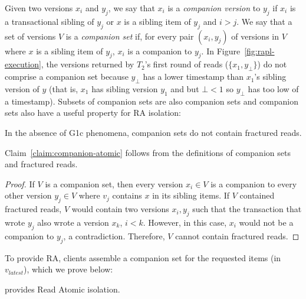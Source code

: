 Given two versions $x_i$ and $y_j$, we say that $x_i$ is a
\textit{companion version} to $y_j$ if $x_i$ is a transactional
sibling of $y_j$ or $x$ is a sibling item of $y_j$ and $i > j$. We say
that a set of versions $V$ is a \textit{companion set} if, for every
pair $(x_i, y_j)$ of versions in $V$ where $x$ is a sibling item of
$y_j$, $x_i$ is a companion to $y_j$. In
Figure~\ref{fig:rapl-execution}, the versions returned by $T_2$'s
first round of reads ($\{x_1, y_\bot\}$) do not comprise a companion
set because $y_\bot$ has a lower timestamp than $x_1$'s sibling
version of $y$ (that is, $x_1$ has sibling version $y_1$ and but $\bot
< 1$ so $y_\bot$ has too low of a timestamp). Subsets of companion
sets are also companion sets and companion sets also have a useful
property for RA isolation:
\begin{claim}
\label{claim:companion-atomic}
In the absence of G1c phenomena, companion sets do not contain fractured reads.
\end{claim}

Claim~\ref{claim:companion-atomic} follows from the definitions of
companion sets and fractured reads.

\begin{proof}
If $V$ is a companion set, then
every version $x_i \in V$ is a companion to every other version
$y_j \in V$ where $v_j$ contains $x$ in its sibling items. If $V$
contained fractured reads, $V$ would contain two versions $x_i,y_j$
such that the transaction that wrote $y_j$ also wrote a version $x_k$,
$i<k$. However, in this case, $x_i$ would not be a companion to
$y_j$, a contradiction. Therefore, $V$ cannot contain fractured reads.
\end{proof}

To provide RA, \rapl clients assemble a companion set for the
requested items (in $v_{latest}$), which we prove below:

\begin{claim}\rapl provides Read Atomic isolation.\end{claim}

